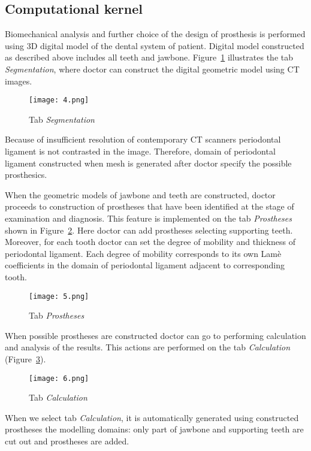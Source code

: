 \documentclass{elsarticle}
\begin{document}
\subsection{Computational kernel} 

Biomechanical analysis and further choice of the design of prosthesis
is performed using 3D digital model of the dental system of
patient. Digital model constructed as described above includes all
teeth and jawbone. Figure~\ref{fig:4} illustrates the tab
\emph{Segmentation}, where doctor can construct the digital geometric
model using CT images.
\begin{figure}[h]
  \centering
  \texttt{[image: 4.png]}
  \caption{Tab \emph{Segmentation}}
  \label{fig:4}
\end{figure}

Because of insufficient resolution of contemporary CT scanners
periodontal ligament is not contrasted in the image. Therefore, domain of
periodontal ligament constructed when mesh is generated after doctor specify
the possible prosthesics.

When the geometric models of jawbone and teeth are constructed, doctor
proceeds to construction of prostheses that have been identified at
the stage of examination and diagnosis. This feature is implemented on
the tab \emph{Prostheses} shown in Figure~\ref{fig:5}. Here doctor can add
prostheses selecting supporting teeth. Moreover, for each tooth doctor can
set the degree of mobility and thickness of periodontal ligament. Each degree
of mobility corresponds to its own Lam\`e coefficients in the domain
of periodontal ligament adjacent to corresponding tooth.
\begin{figure}[h]
  \centering
  \texttt{[image: 5.png]}
  \caption{Tab \emph{Prostheses}}
  \label{fig:5}
\end{figure}

When possible prostheses are constructed doctor can go to
performing calculation and analysis of the results. This actions are
performed on the tab \emph{Calculation} (Figure~\ref{fig:6}).
\begin{figure}[h]
  \centering
  \texttt{[image: 6.png]}
  \caption{Tab \emph{Calculation}}
  \label{fig:6}
\end{figure}

When we select tab \emph{Calculation}, it is automatically generated
using constructed prostheses the modelling domains: only part of
jawbone and supporting teeth are cut out and prostheses are added.
\end{document}
